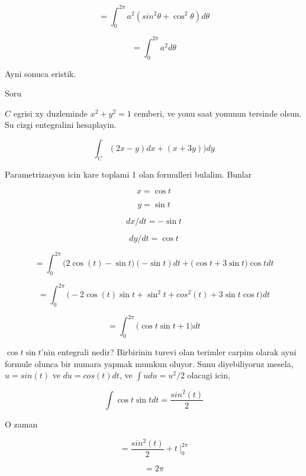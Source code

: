 \documentclass[12pt,fleqn]{article}\usepackage{../common}
\begin{document}
\[ = \int_0^{2\pi} a^2 (sin^2\theta + \cos^2\theta)d\theta \]

\[ = \int_0^{2\pi} a^2 d\theta \]

Ayni sonuca eristik. 

Soru 

$C$ egrisi xy duzleminde $x^2+y^2=1$ cemberi, ve yonu saat yonunun tersinde
olsun. Su cizgi entegralini hesaplayin.

\[ \int_C (2x-y)dx + (x+3y))dy \]

Parametrizasyon icin kare toplami 1 olan formulleri bulalim. Bunlar

\[ x = \cos t \]

\[ y = \sin t \]

\[ dx/dt = -\sin t\]

\[ dy/dt = \cos t \]

\[ =
\int_0^{2\pi} \bigg( 2\cos(t) - \sin t \bigg)(-\sin t )dt + 
\bigg(\cos t + 3\sin t \bigg) \cos t dt
 \]

\[ = 
\int_0^{2\pi} \bigg( 
-2\cos(t)\sin t + \sin^2 t + 
cos^2(t) + 3 \sin t \cos t
\bigg) dt
 \]

\[ = 
\int_0^{2\pi} \bigg( 
\cos t \sin t + 1
\bigg) dt
 \]

$\cos t \sin t$'nin entegrali nedir? Birbirinin turevi olan terimler carpim
olarak ayni formule olunca bir numara yapmak mumkun oluyor. Sunu 
diyebiliyoruz mesela, $u=sin(t)$ ve $du=cos(t)dt$, ve $\int u du = u^2/2$
olacagi icin, 

\[ \int \cos t \sin t dt = \frac{sin^2(t)}{2} \]

O zaman 

\[ = \frac{sin^2(t)}{2} + t \ \bigg|_0^{2\pi}  \]

\[ =  2\pi \]
\end{document}
